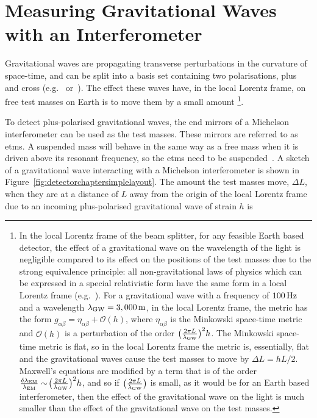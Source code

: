 \section{Measuring Gravitational Waves with an Interferometer}
Gravitational waves are propagating transverse perturbations in the curvature of space-time, and can be split into a basis set containing two polarisations, plus and cross (e.g.~\cite{charlesmisner2017} or~\cite{Schutz2009}). The effect these waves have, in the local Lorentz frame, on free test masses on Earth is to move them by a small amount \footnote{In the local Lorentz frame of the beam splitter, for any feasible Earth based detector, the effect of a gravitational wave on the wavelength of the light is negligible compared to its effect on the positions of the test masses due to the strong equivalence principle: all non-gravitational laws of physics which can be expressed in a special relativistic form have the same form in a local Lorentz frame (e.g.~\cite{charlesmisner2017}). For a gravitational wave with a frequency of $100\,\rm{Hz}$ and a wavelength $\lambda_{\rm{GW}} = 3,000\,\rm{m}$, in the local Lorentz frame, the metric has the form $g_{\alpha\beta} = \eta_{\alpha\beta} + \mathcal{O}(h)$, where $\eta_{\alpha\beta}$ is the Minkowski space-time metric and $\mathcal{O}(h)$ is a perturbation of the order $\big(\frac{2\pi L}{\lambda_{\rm{GW}}}\big)^2h$. The Minkowski space-time metric is flat, so in the local Lorentz frame the metric is, essentially, flat and the gravitational waves cause the test masses to move by $\Delta L = hL/2$. Maxwell's equations are modified by a term that is of the order $\frac{\delta \lambda_{\rm{EM}}}{\lambda_{\rm{EM}}} \sim\! \big(\frac{2\pi L}{\lambda_{\rm{GW}}}\big)^2h$, and so if $\big(\frac{2\pi L}{\lambda_{\rm{GW}}}\big)$ is small, as it would be for an Earth based interferometer, then the effect of the gravitational wave on the light is much smaller than the effect of the gravitational wave on the test masses.}. 
\par
To detect plus-polarised gravitational waves, the end mirrors of a Michelson interferometer can be used as the test masses. These mirrors are referred to as \glspl{etm}. A suspended mass will behave in the same way as a free mass when it is driven above its resonant frequency, so the \glspl{etm} need to be suspended~\cite{Aston2012}. A sketch of a gravitational wave interacting with a Michelson interferometer is shown in Figure~\ref{fig:detectorchaptersimplelayout}. The amount the test masses move, $\Delta L$, when they are at a distance of $L$ away from the origin of the local Lorentz frame due to an incoming plus-polarised gravitational wave of strain $h$ is 
